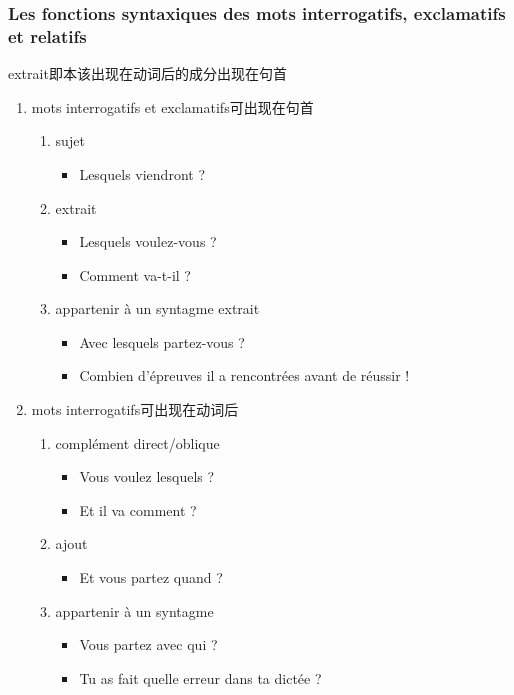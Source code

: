 \documentclass[UTF8]{report}
\begin{document}
\subsubsection{ Les fonctions syntaxiques des mots interrogatifs, exclamatifs et relatifs}
extrait即本该出现在动词后的成分出现在句首
\begin{enumerate}
    \item mots interrogatifs et exclamatifs可出现在句首
    \begin{enumerate}
        \item sujet
        \begin{itemize}
            \item Lesquels viendront ?
        \end{itemize}
        \item extrait
        \begin{itemize}
            \item Lesquels voulez-vous ?
            \item Comment va-t-il ?
        \end{itemize}
        \item appartenir à un syntagme extrait
        \begin{itemize}
            \item Avec lesquels partez-vous ?
            \item Combien d’épreuves il a rencontrées avant de réussir !
        \end{itemize}
    \end{enumerate}
    \item mots interrogatifs可出现在动词后
    \begin{enumerate}
        \item complément direct/oblique
        \begin{itemize}
            \item Vous voulez lesquels ?
            \item Et il va comment ?
        \end{itemize}
        \item ajout
        \begin{itemize}
            \item Et vous partez quand ?
        \end{itemize}
        \item appartenir à un syntagme
        \begin{itemize}
            \item Vous partez avec qui ?
            \item Tu as fait quelle erreur dans ta dictée ?

\end{itemize}
\end{enumerate}
\end{enumerate}
\end{document}
